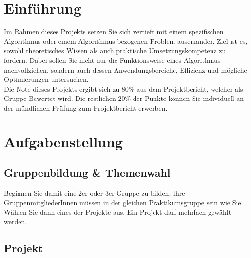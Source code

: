\documentclass[12pt, a4]{article}
\begin{document}
\section{Einführung}

Im Rahmen dieses Projekts setzen Sie sich vertieft mit einem spezifischen Algorithmus oder einem Algorithmus-bezogenen Problem auseinander.
Ziel ist es, sowohl theoretisches Wissen als auch praktische Umsetzungskompetenz zu fördern.
Dabei sollen Sie nicht nur die Funktionsweise eines Algorithmus nachvollziehen, sondern auch dessen Anwendungsbereiche, Effizienz und mögliche Optimierungen untersuchen.\\
Die Note dieses Projekts ergibt sich zu 80\% aus dem Projektbericht, welcher als Gruppe Bewertet wird.
Die restlichen 20\% der Punkte können Sie individuell an der mündlichen Prüfung zum Projektbericht erwerben.

\section{Aufgabenstellung}

\subsection*{Gruppenbildung \& Themenwahl}
Beginnen Sie damit eine 2er oder 3er Gruppe zu bilden.
Ihre GruppenmitgliederInnen müssen in der gleichen Praktikumsgruppe sein wie Sie.
Wählen Sie dann eines der Projekte aus.
Ein Projekt darf mehrfach gewählt werden.

\subsection*{Projekt}
\end{document}
